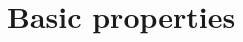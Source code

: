 \documentclass[11pt, leqno, fleqn]{amsart}
\def\clb{   \color{black}}
\theoremstyle{definition}
\theoremstyle{definition}
\def \vol{  {\rm vol} }
\begin{document}
  
%  
%  
%
%  
%  
%  
%  
%  
%  
%  
%  
%   
%		 
	
	
		 
		 
		\section{Basic properties} \label{sec Basic properties}
		
	
\end{document}
